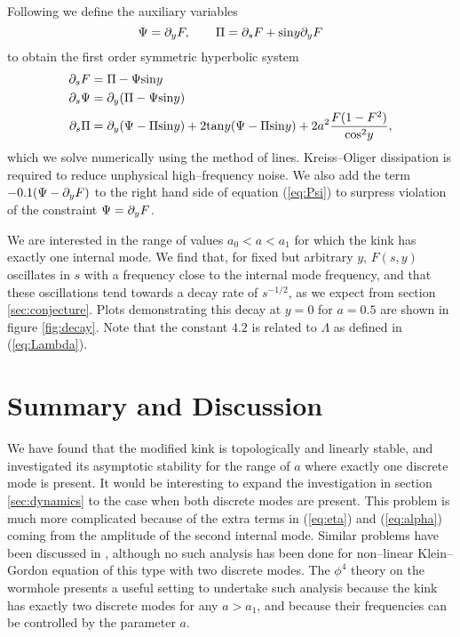 Following \cite{wavemaps, sym_hyp} we define the auxiliary variables
\[
\Psi = \partial_yF, \qquad \Pi = \partial_sF + \mathrm{sin}y\partial_yF
\]
to obtain the first order symmetric hyperbolic system
\begin{align}
\partial_sF &= \Pi - \Psi\mathrm{sin}y \\
\label{eq:Psi} \partial_s\Psi &= \partial_y(\Pi-\Psi\mathrm{sin}y) \\
\partial_s\Pi &= \partial_y(\Psi-\Pi\mathrm{sin}y) + 2\mathrm{tan}y(\Psi-\Pi\mathrm{sin}y) + 2a^2\frac{F(1-F^2)}{\mathrm{cos}^2y},
\end{align}
which we solve numerically using the method of lines. Kreiss--Oliger dissipation is required to reduce unphysical high--frequency noise. We also add the term $-0.1(\Psi-\partial_yF)$ to the right hand side of equation (\ref{eq:Psi}) to surpress violation of the constraint $\Psi=\partial_yF$.

We are interested in the range of values $a_0<a<a_1$ for which the kink has exactly one internal mode. We find that, for fixed but arbitrary $y$, $F(s,y)$ oscillates in $s$ with a frequency close to the internal mode frequency, and that these oscillations tend towards a decay rate of $s^{-1/2}$, as we expect from section \ref{sec:conjecture}. Plots demonstrating this decay at $y=0$ for $a=0.5$ are shown in figure \ref{fig:decay}. Note that the constant $4.2$ is related to $\Lambda$ as defined in (\ref{eq:Lambda}).

\section{Summary and Discussion}

We have found that the modified kink is topologically and linearly stable, and investigated its asymptotic stability for the range of $a$ where exactly one discrete mode is present. It would be interesting to expand the investigation in section \ref{sec:dynamics} to the case when both discrete modes are present. This problem is much more complicated because of the extra terms in (\ref{eq:eta}) and (\ref{eq:alpha}) coming from the amplitude of the second internal mode. Similar problems have been discussed in \cite{Weinstein}, although no such analysis has been done for non--linear Klein--Gordon equation of this type with two discrete modes. The $\phi^4$ theory on the wormhole presents a useful setting to undertake such analysis because the kink has exactly two discrete modes for any $a>a_1$, and because their frequencies can be controlled by the parameter $a$.

